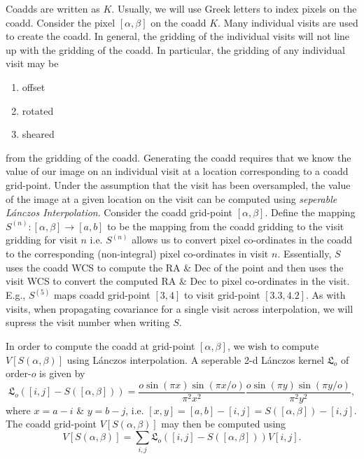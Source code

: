 \documentclass[times]{aastex6}
\begin{document}
Coadds are written as $K$. Usually, we will use Greek letters to index pixels on the coadd. Consider the pixel $[\alpha,\beta]$ on the coadd $K$. Many individual visits are used to create the coadd. In general, the gridding of the individual visits will not line up with the gridding of the coadd. In particular, the gridding of any individual visit may be
\begin{enumerate}
  \item offset
  \item rotated
  \item sheared
\end{enumerate}
from the gridding of the coadd. Generating the coadd requires that we know the value of our image on an individual visit at a location corresponding to a coadd grid-point. Under the assumption that the visit has been oversampled, the value of the image at a given location on the visit can be computed using {\it seperable L\'{a}nczos Interpolation}. Consider the coadd grid-point $[\alpha, \beta]$. Define the mapping $S^{(n)}: [\alpha, \beta] \rightarrow [a,b]$ to be the mapping from the coadd gridding to the visit gridding for visit $n$ i.e. $S^{(n)}$ allows us to convert pixel co-ordinates in the coadd to the corresponding (non-integral) pixel co-ordinates in visit $n$. Essentially, $S$ uses the coadd WCS to compute the RA \& Dec of the point and then uses the visit WCS to convert the computed RA \& Dec to pixel co-ordinates in the visit. E.g., $S^{(5)}$ maps coadd grid-point $[3,4]$ to visit grid-point $[3.3, 4.2]$. As with visits, when propagating covariance for a single visit across interpolation, we will supress the visit number when writing $S$.

In order to compute the coadd at grid-point $[\alpha, \beta]$, we wish to compute $V[S(\alpha, \beta)]$ using L\'{a}nczos interpolation. A seperable 2-d L\'{a}nczos kernel $\mathfrak{L}_{o}$ of order-$o$ is given by
\begin{equation}\label{eq:LanczosKernel}
  \mathfrak{L}_{o}([i,j] - S([\alpha, \beta])) = \frac{o \sin(\pi x) \sin(\pi x/o)}{\pi^{2} x^{2}} \frac{o \sin(\pi y) \sin(\pi y/o)}{\pi^{2} y^{2}},
\end{equation}
where $x = a - i$ \& $y = b - j$, i.e. $[x,y] = [a,b] - [i,j] = S([\alpha, \beta]) - [i,j]$. The coadd grid-point $V[S(\alpha, \beta)]$ may then be computed using
\begin{equation}\label{eq:LanczosInterp}
  V[S(\alpha, \beta)] = \sum_{i,j}\mathfrak{L}_{o}([i,j] - S([\alpha, \beta]))V[i,j].
\end{equation}
\end{document}
